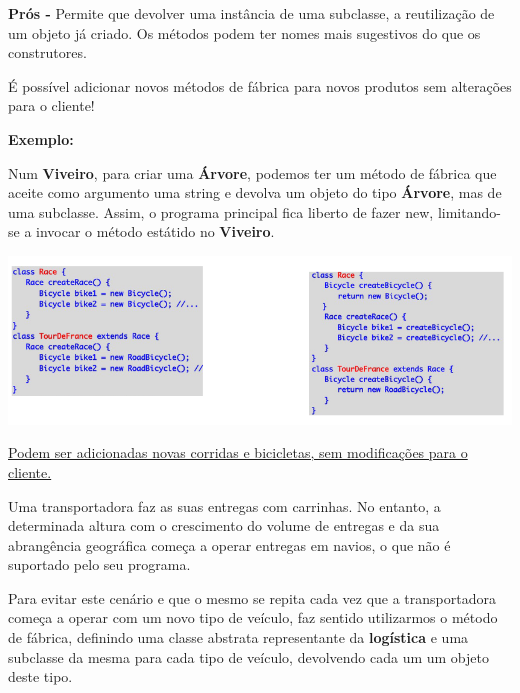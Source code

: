 \documentclass{article}
\begin{document}
\begin{flushleft}
    \textbf{Prós -} Permite que devolver uma instância de uma subclasse, a reutilização de um objeto já
    criado. Os métodos podem ter nomes mais sugestivos do que os construtores.

    É possível adicionar novos métodos de fábrica para novos produtos sem alterações
    para o cliente! 
\end{flushleft}

\begin{flushleft}
    \textbf{Exemplo:}

    \vspace{2mm}
    Num \textbf{Viveiro}, para criar uma \textbf{Árvore}, podemos ter um método de fábrica que aceite como argumento
    uma string e devolva um objeto do tipo \textbf{Árvore}, mas de uma subclasse. Assim, o programa principal fica
    liberto de fazer new, limitando-se a invocar o método estátido no \textbf{Viveiro}.

    \begin{center}
        \includegraphics[scale=0.4]{Images/25.png}
    \end{center}

    \uline{Podem ser adicionadas novas corridas e bicicletas, sem modificações para o cliente.}

    \pagebreak

    Uma transportadora faz as suas entregas com carrinhas. No entanto, a determinada altura com o
    crescimento do volume de entregas e da sua abrangência geográfica começa a operar entregas em
    navios, o que não é suportado pelo seu programa.

    Para evitar este cenário e que o mesmo se repita cada vez que a transportadora começa a operar com um
    novo tipo de veículo, faz sentido utilizarmos o método de fábrica, definindo uma classe abstrata
    representante da \textbf{logística} e uma subclasse da mesma para cada tipo de veículo, devolvendo cada um
    um objeto deste tipo.


\end{flushleft}
\end{document}
